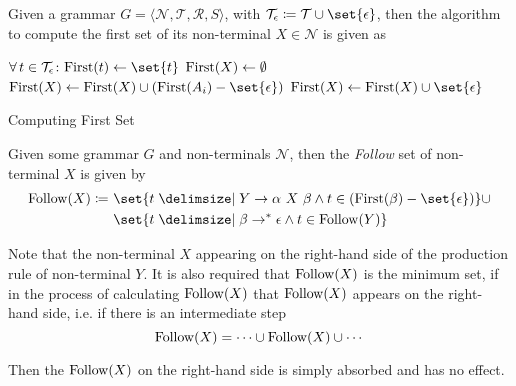 \begin{definition}
    Given a grammar $G = \langle \mathcal{N}, \mathcal{T}, \mathcal{R}, S \rangle$, with $\mathcal{T}_\epsilon \coloneq \mathcal{T} \cup \set{\epsilon}$, then the algorithm to compute the first set of its non-terminal $X \in \mathcal{N}$ is given as
    \begin{algorithm}[H]
        \begin{algorithmic}[1]
                \State $\Forall t \in \mathcal{T}_\epsilon \colon  \First{t} \gets \set{t}$
                \State $\mathrm{First}{(X)} \gets \emptyset$
                        \State $\First{X} \gets \First{X} \cup (\First{A_i} - \set{\epsilon})$
                            \State {}
                        \EndIf
                    \EndFor
                    \State $\First{X} \gets \First{X} \cup \set{\epsilon}$ 
                \EndFor
                \State {}
            \EndProcedure
        \end{algorithmic}
        \caption{Computing First Set}
        \label{prog:compute-first-set}
    \end{algorithm}
\end{definition}

\begin{definition}
    Given some grammar $G$ and non-terminals $\mathcal{N}$, then the \textit{Follow} set of non-terminal $X$ is given by
    \begin{equation}
        \begin{split}
            \Follow{X} \coloneqq &\ \set{ t \given Y \to \alpha\ X\ \beta \land t \in (\First{\beta} - \set{\epsilon}) } 
            \cup \\ &\ \set{ t \given \beta \to^\ast \epsilon \land t \in \Follow{Y} }
        \end{split}
    \end{equation}
    
    Note that the non-terminal $X$ appearing on the right-hand side of the production rule of non-terminal $Y$. It is also required that $\mathrm{Follow}{(X)}$ is the minimum set, if in the process of calculating $\mathrm{Follow}{(X)}$ that $\mathrm{Follow}{(X)}$ appears on the right-hand side, i.e. if there is an intermediate step
    \begin{equation}
        \mathrm{Follow}{(X)} = \cdots \cup \mathrm{Follow}{(X)} \cup \cdots
    \end{equation}
    
    Then the $\mathrm{Follow}{(X)}$ on the right-hand side is simply absorbed and has no effect.
\end{definition}

